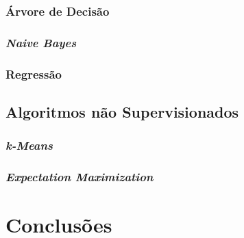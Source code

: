 \documentclass{article}
\begin{document}
\subsubsection{Árvore de Decisão}

\subsubsection{{\b \it Naive Bayes}}

\subsubsection{Regressão}

\subsection{Algoritmos não Supervisionados}

\subsubsection{{\b \it k-Means}}

\subsubsection{{\b \it Expectation Maximization}}

\section{Conclusões}


\end{document}
